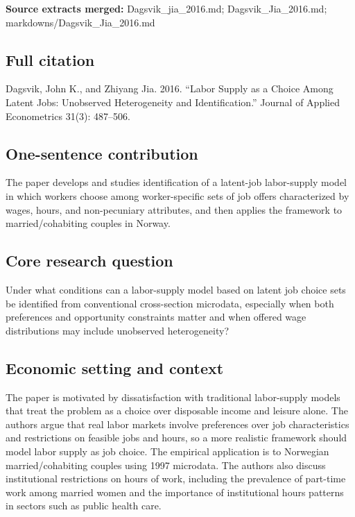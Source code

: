 \documentclass[11pt,a4paper]{article}
\begin{document}
\textbf{Source extracts merged:} Dagsvik\_jia\_2016.md; Dagsvik\_Jia\_2016.md; markdowns/Dagsvik\_Jia\_2016.md

\subsection*{Full citation}
Dagsvik, John K., and Zhiyang Jia. 2016. “Labor Supply as a Choice Among Latent Jobs: Unobserved Heterogeneity and Identification.” Journal of Applied Econometrics 31(3): 487–506.

\subsection*{One-sentence contribution}
The paper develops and studies identification of a latent-job labor-supply model in which workers choose among worker-specific sets of job offers characterized by wages, hours, and non-pecuniary attributes, and then applies the framework to married/cohabiting couples in Norway.

\subsection*{Core research question}
Under what conditions can a labor-supply model based on latent job choice sets be identified from conventional cross-section microdata, especially when both preferences and opportunity constraints matter and when offered wage distributions may include unobserved heterogeneity?

\subsection*{Economic setting and context}
The paper is motivated by dissatisfaction with traditional labor-supply models that treat the problem as a choice over disposable income and leisure alone. The authors argue that real labor markets involve preferences over job characteristics and restrictions on feasible jobs and hours, so a more realistic framework should model labor supply as job choice. The empirical application is to Norwegian married/cohabiting couples using 1997 microdata. The authors also discuss institutional restrictions on hours of work, including the prevalence of part-time work among married women and the importance of institutional hours patterns in sectors such as public health care.
\end{document}
